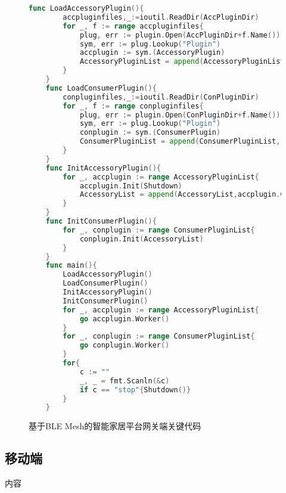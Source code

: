 \begin{figure}[H]
    \centering
    \begin{lstlisting}[language=Go]
    func LoadAccessoryPlugin(){
        accpluginfiles,_:=ioutil.ReadDir(AccPluginDir)
        for _, f := range accpluginfiles{
            plug, err := plugin.Open(AccPluginDir+f.Name())
            sym, err := plug.Lookup("Plugin")
            accplugin := sym.(AccessoryPlugin)
            AccessoryPluginList = append(AccessoryPluginList, accplugin)
        }
    }
    func LoadConsumerPlugin(){
        conpluginfiles,_:=ioutil.ReadDir(ConPluginDir)
        for _, f := range conpluginfiles{
            plug, err := plugin.Open(ConPluginDir+f.Name())
            sym, err := plug.Lookup("Plugin")
            conplugin := sym.(ConsumerPlugin)
            ConsumerPluginList = append(ConsumerPluginList, conplugin)
        }
    }
    func InitAccessoryPlugin(){
        for _, accplugin := range AccessoryPluginList{
            accplugin.Init(Shutdown)
            AccessoryList = append(AccessoryList,accplugin.GetAccessoryList()...)
        }
    }
    func InitConsumerPlugin(){
	    for _, conplugin := range ConsumerPluginList{
	    	conplugin.Init(AccessoryList)
	    }
    }
    func main(){
        LoadAccessoryPlugin()
        LoadConsumerPlugin()
        InitAccessoryPlugin()
        InitConsumerPlugin()
        for _, accplugin := range AccessoryPluginList{
            go accplugin.Worker()
        }
        for _, conplugin := range ConsumerPluginList{
            go conplugin.Worker()
        }
        for{
            c := ""
            _, _ = fmt.Scanln(&c)
            if c == "stop"{Shutdown()}
        }
    }
    \end{lstlisting}
    \caption{基于BLE Mesh的智能家居平台网关端关键代码}
    \label{fig:code_gateway}
\end{figure}

\subsection{移动端}
内容
